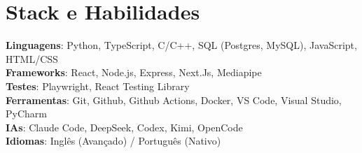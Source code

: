 \documentclass[letterpaper,11pt]{article}
\begin{document}
\section{Stack e Habilidades}
 \begin{itemize}[leftmargin=0.15in, label={}]
    \small{\item{
     \textbf{Linguagens}{: Python, TypeScript, C/C++, SQL (Postgres, MySQL), JavaScript, HTML/CSS} \\
     \textbf{Frameworks}{: React, Node.js, Express, Next.Js, Mediapipe} \\
     \textbf{Testes}{: Playwright, React Testing Library} \\
     \textbf{Ferramentas}{: Git, Github, Github Actions, Docker, VS Code, Visual Studio, PyCharm} \\
     \textbf{IAs}{: Claude Code, DeepSeek, Codex, Kimi, OpenCode} \\
     \textbf{Idiomas}{: Inglês (Avançado) / Português (Nativo)}
    }}
 \end{itemize}

\end{document}
